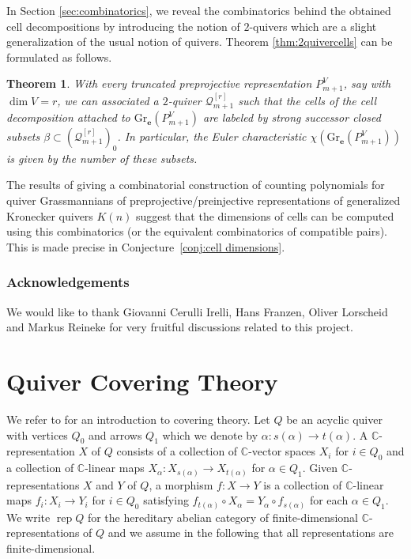 \documentclass{amsart}
\newcommand{\sayT}[1]{\say[T]{#1}}
\newtheorem{thm}{Theorem}
\numberwithin{equation}{section}
\newcommand{\C}{\mathbb{C}}
\newcommand{\CC}{\mathbb{C}}
\newcommand{\bfe}{\mathbf{e}}
\newcommand{\Gr}{\mathrm{Gr}}
\newcommand{\rep}{\operatorname{rep}}
\begin{document}
In Section \ref{sec:combinatorics}, we reveal the combinatorics behind the obtained cell decompositions by introducing the notion of $2$-quivers which are a slight generalization of the usual notion of quivers.
Theorem \ref{thm:2quivercells} can be formulated as follows.
\begin{thm}
  With every truncated preprojective representation $P_{m+1}^V$, say with $\dim V=r$, we can associated a $2$-quiver $\mathcal Q_{m+1}^{[r]}$ such that the cells of the cell decomposition attached to $\Gr_\bfe(P_{m+1}^V)$ are labeled by strong successor closed subsets $\beta\subset (\mathcal Q_{m+1}^{[r]})_0$.
  In particular, the Euler characteristic $\chi(\Gr_\bfe(P_{m+1}^V))$ is given by the number of these subsets.
\end{thm}

The results of \cite{rupel} giving a combinatorial construction of counting polynomials for quiver Grassmannians of preprojective/preinjective representations of generalized Kronecker quivers $K(n)$ suggest that the dimensions of cells can be computed using this combinatorics (or the equivalent combinatorics of compatible pairs).
This is made precise in Conjecture~\ref{conj:cell dimensions}.
\subsubsection*{Acknowledgements}We would like to thank Giovanni Cerulli Irelli, Hans Franzen, Oliver Lorscheid and Markus Reineke for very fruitful discussions related to this project.
\section{Quiver Covering Theory}
\label{sec:covering}
\noindent
We refer to \cite{gab} for an introduction to covering theory.
Let $Q$ be an acyclic quiver with vertices $Q_0$ and arrows $Q_1$ which we denote by $\alpha:s(\alpha)\to t(\alpha)$.
A $\CC$-representation $X$ of $Q$ consists of a collection of $\CC$-vector spaces $X_i$ for $i\in Q_0$ and a collection of $\CC$-linear maps $X_\alpha:X_{s(\alpha)}\to X_{t(\alpha)}$ for $\alpha\in Q_1$.
Given $\CC$-representations $X$ and $Y$ of $Q$, a morphism $f:X\to Y$ is a collection of $\CC$-linear maps $f_i:X_i\to Y_i$ for $i\in Q_0$ satisfying $f_{t(\alpha)}\circ X_\alpha=Y_\alpha\circ f_{s(\alpha)}$ for each $\alpha\in Q_1$.
We write $\rep Q$ for the hereditary abelian category of finite-dimensional $\C$-representations of $Q$ and we assume in the following that all representations are finite-dimensional.
\end{document}
